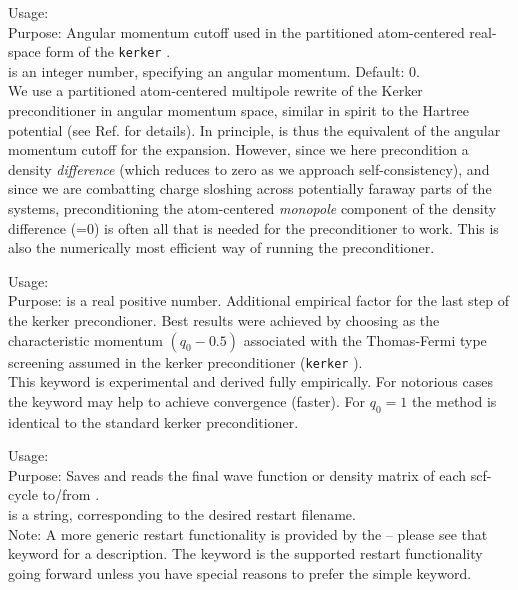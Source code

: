 {
  \noindent
  Usage:   \\[1.0ex]
  Purpose: Angular momentum cutoff used in the partitioned
    atom-centered real-space form of the \texttt{kerker}
    . \\[1.0ex]
   is an integer number, specifying an angular
    momentum. Default: 0. \\
}
We use a partitioned atom-centered multipole rewrite of the Kerker
preconditioner in angular momentum space, similar in spirit to the
Hartree potential (see Ref. \cite{Blum08} for details). In principle,
 is thus the equivalent of the
 angular momentum cutoff for the expansion.
However, since
we here precondition a density \emph{difference} (which reduces to
zero as we approach self-consistency), and since we are combatting
charge sloshing across potentially faraway parts of the systems,
preconditioning the atom-centered \emph{monopole} component of the
density difference (=0) is often all that is needed
for the preconditioner to work. This is also the numerically most
efficient way of running the preconditioner.

{
  \noindent
  Usage:   \\[1.0ex]
  Purpose:  is a real
        positive number. Additional empirical factor for the last
        step of the kerker precondioner. Best results were achieved by
        choosing  as the characteristic momentum $(q_0-0.5)$
        associated with the Thomas-Fermi type screening assumed in the
        kerker preconditioner (\texttt{kerker}
    ). \\[1.0ex]
}
This keyword is experimental and derived fully empirically. For notorious cases
the keyword may help to achieve convergence (faster). For $q_0=1$ the method is
identical to the standard kerker preconditioner.

{
  \noindent
  Usage:   \\[1.0ex]
  Purpose: Saves and reads the final wave function or
    density matrix of each scf-cycle
    to/from .\\[1.0ex]
   is a string, corresponding to the desired restart filename. \\
}
Note: A more generic restart functionality is provided by the
 -- please see that keyword for a
description. The 
 keyword is the supported restart functionality
going forward unless you have special reasons to prefer the
simple  keyword. 

